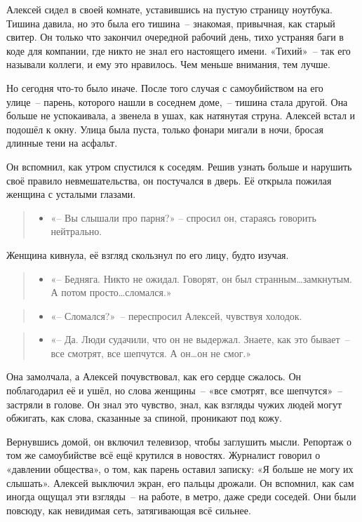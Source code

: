 \documentclass[12pt,a4paper]{book}
\newenvironment{dialogue}{\begin{quote}\itshape\begin{itemize}\item[]}{\end{itemize}\end{quote}}
\begin{document}
Алексей сидел в своей комнате, уставившись на пустую страницу ноутбука. Тишина давила, но это была его тишина~-- знакомая, привычная, как старый свитер. Он только что закончил очередной рабочий день, тихо устраняя баги в коде для компании, где никто не знал его настоящего имени. «Тихий»~-- так его называли коллеги, и ему это нравилось. Чем меньше внимания, тем лучше.

Но сегодня что-то было иначе. После того случая с самоубийством на его улице~-- парень, которого нашли в соседнем доме,~-- тишина стала другой. Она больше не успокаивала, а звенела в ушах, как натянутая струна. Алексей встал и подошёл к окну. Улица была пуста, только фонари мигали в ночи, бросая длинные тени на асфальт.

Он вспомнил, как утром спустился к соседям. Решив узнать больше и нарушить своё правило невмешательства, он постучался в дверь. Её открыла пожилая женщина с усталыми глазами.

\begin{dialogue}
    «-- Вы слышали про парня?» -- спросил он, стараясь говорить нейтрально.
\end{dialogue}

Женщина кивнула, её взгляд скользнул по его лицу, будто изучая.

\begin{dialogue}
«-- Бедняга. Никто не ожидал. Говорят, он был странным\ldots замкнутым. А потом просто\ldots сломался.»
\end{dialogue}

\begin{dialogue}
«-- Сломался?»~-- переспросил Алексей, чувствуя холодок.
\end{dialogue}

\begin{dialogue}
«-- Да. Люди судачили, что он не выдержал. Знаете, как это бывает~-- все смотрят, все шепчутся. А он\ldots он не смог.»
\end{dialogue}

Она замолчала, а Алексей почувствовал, как его сердце сжалось. Он поблагодарил её и ушёл, но слова женщины~-- «все смотрят, все шепчутся»~-- застряли в голове. Он знал это чувство, знал, как взгляды чужих людей могут обжигать, как слова, сказанные за спиной, проникают под кожу.

Вернувшись домой, он включил телевизор, чтобы заглушить мысли. Репортаж о том же самоубийстве всё ещё крутился в новостях. Журналист говорил о «давлении общества», о том, как парень оставил записку: «Я больше не могу их слышать». Алексей выключил экран, его пальцы дрожали. Он вспомнил, как сам иногда ощущал эти взгляды~-- на работе, в метро, даже среди соседей. Они были повсюду, как невидимая сеть, затягивающая всё сильнее.
\end{document}
